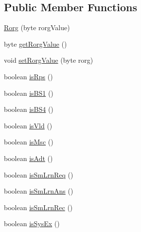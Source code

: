 \subsection*{Public Member Functions}
\begin{DoxyCompactItemize}
\item 
\hyperlink{classit_1_1polito_1_1elite_1_1enocean_1_1enj_1_1eep_1_1_rorg_acf3c5628aa2de289700793b6b56d22a6}{Rorg} (byte rorg\+Value)
\item 
byte \hyperlink{classit_1_1polito_1_1elite_1_1enocean_1_1enj_1_1eep_1_1_rorg_a23e28266a7c2c826774ac489454e6952}{get\+Rorg\+Value} ()
\item 
void \hyperlink{classit_1_1polito_1_1elite_1_1enocean_1_1enj_1_1eep_1_1_rorg_a94c64d248ad2e2a44ee733b0c437abad}{set\+Rorg\+Value} (byte rorg)
\item 
boolean \hyperlink{classit_1_1polito_1_1elite_1_1enocean_1_1enj_1_1eep_1_1_rorg_a0d867eda5033139f161f83be685c9cdc}{is\+Rps} ()
\item 
boolean \hyperlink{classit_1_1polito_1_1elite_1_1enocean_1_1enj_1_1eep_1_1_rorg_a077d79ae2a02ae64bb396a178cc38ce5}{is\+B\+S1} ()
\item 
boolean \hyperlink{classit_1_1polito_1_1elite_1_1enocean_1_1enj_1_1eep_1_1_rorg_aff92464b1d6b605738c852b74abc4e44}{is\+B\+S4} ()
\item 
boolean \hyperlink{classit_1_1polito_1_1elite_1_1enocean_1_1enj_1_1eep_1_1_rorg_ae0b182a3db577554f5f2f4fcd6beb040}{is\+Vld} ()
\item 
boolean \hyperlink{classit_1_1polito_1_1elite_1_1enocean_1_1enj_1_1eep_1_1_rorg_a544e7b60900c0dc8d3715232db3e211a}{is\+Msc} ()
\item 
boolean \hyperlink{classit_1_1polito_1_1elite_1_1enocean_1_1enj_1_1eep_1_1_rorg_acf1b6334c09e05b871760d7ba51f29a6}{is\+Adt} ()
\item 
boolean \hyperlink{classit_1_1polito_1_1elite_1_1enocean_1_1enj_1_1eep_1_1_rorg_a815882ad0a41bfc3ad81bd3c3d605ff9}{is\+Sm\+Lrn\+Req} ()
\item 
boolean \hyperlink{classit_1_1polito_1_1elite_1_1enocean_1_1enj_1_1eep_1_1_rorg_ad1e4dec5eafea746a276b700cac72964}{is\+Sm\+Lrn\+Ans} ()
\item 
boolean \hyperlink{classit_1_1polito_1_1elite_1_1enocean_1_1enj_1_1eep_1_1_rorg_ac28fde2bd8333bc1597e6160bd31fc33}{is\+Sm\+Lrn\+Rec} ()
\item 
boolean \hyperlink{classit_1_1polito_1_1elite_1_1enocean_1_1enj_1_1eep_1_1_rorg_aa16c4143f4b42cf2a24e07a5ad501c17}{is\+Sys\+Ex} ()
\item 

\end{DoxyCompactItemize}
